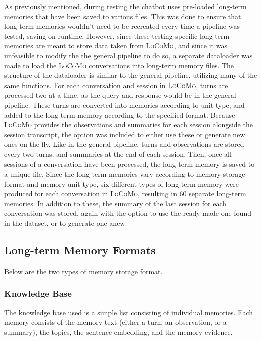 As previously mentioned, during testing the chatbot uses pre-loaded long-term memories that have been saved to various files. This was done to ensure that long-term memories wouldn't need to be recreated every time a pipeline was tested, saving on runtime. However, since these testing-specific long-term memories are meant to store data taken from \textsc{LoCoMo}, and since it was unfeasible to modify the the general pipeline to do so, a separate dataloader was made to load the \textsc{LoCoMo} conversations into long-term memory files. The structure of the dataloader is similar to the general pipeline, utilizing many of the same functions. For each conversation and session in \textsc{LoCoMo}, turns are processed two at a time, as the query and response would be in the general pipeline. These turns are converted into memories according to unit type, and added to the long-term memory according to the specified format. Because \textsc{LoCoMo} provides the observations and summaries for each session alongside the session transcript, the option was included to either use these or generate new ones on the fly. Like in the general pipeline, turns and observations are stored every two turns, and summaries at the end of each session. Then, once all sessions of a conversation have been processed, the long-term memory is saved to a unique file. Since the long-term memories vary according to memory storage format and memory unit type, six different types of long-term memory were produced for each conversation in \textsc{LoCoMo}, resulting in 60 separate long-term memories. In addition to these, the summary of the last session for each conversation was stored, again with the option to use the ready made one found in the dataset, or to generate one anew.



\subsection{Long-term Memory Formats}

Below are the two types of memory storage format. 


\subsubsection{Knowledge Base}

The knowledge base used is a simple list consisting of individual memories. Each memory consists of the memory text (either a turn, an observation, or a summary), the topics, the sentence embedding, and the memory evidence.

